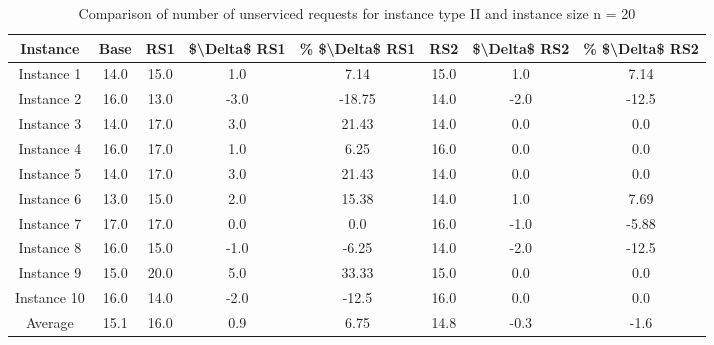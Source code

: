 \begin{table}[H]
\centering
\begin{tabular}{cccccccc}
  \hline
  \textbf{Instance} & \textbf{Base} & \textbf{RS1} & \textbf{\$\textbackslash{}Delta\$  RS1} & \textbf{\% \$\textbackslash{}Delta\$  RS1} & \textbf{RS2} & \textbf{\$\textbackslash{}Delta\$  RS2} & \textbf{\% \$\textbackslash{}Delta\$  RS2} \\\hline
  Instance 1 & 14.0 & 15.0 & 1.0 & 7.14 & 15.0 & 1.0 & 7.14 \\
  Instance 2 & 16.0 & 13.0 & -3.0 & -18.75 & 14.0 & -2.0 & -12.5 \\
  Instance 3 & 14.0 & 17.0 & 3.0 & 21.43 & 14.0 & 0.0 & 0.0 \\
  Instance 4 & 16.0 & 17.0 & 1.0 & 6.25 & 16.0 & 0.0 & 0.0 \\
  Instance 5 & 14.0 & 17.0 & 3.0 & 21.43 & 14.0 & 0.0 & 0.0 \\
  Instance 6 & 13.0 & 15.0 & 2.0 & 15.38 & 14.0 & 1.0 & 7.69 \\
  Instance 7 & 17.0 & 17.0 & 0.0 & 0.0 & 16.0 & -1.0 & -5.88 \\
  Instance 8 & 16.0 & 15.0 & -1.0 & -6.25 & 14.0 & -2.0 & -12.5 \\
  Instance 9 & 15.0 & 20.0 & 5.0 & 33.33 & 15.0 & 0.0 & 0.0 \\
  Instance 10 & 16.0 & 14.0 & -2.0 & -12.5 & 16.0 & 0.0 & 0.0 \\
  Average & 15.1 & 16.0 & 0.9 & 6.75 & 14.8 & -0.3 & -1.6 \\\hline
\end{tabular}
\caption{Comparison of number of unserviced requests for instance type II and instance size n = 20}
\label{tab:wait:resrelocation-nTaxi-comparison_II_20}
\end{table}
